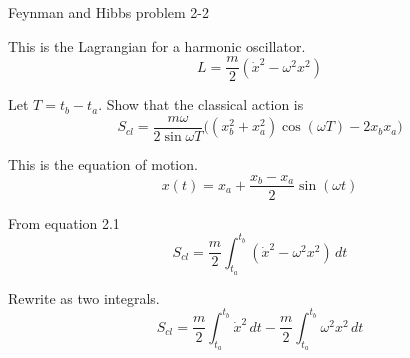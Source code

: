 \documentclass[12pt]{article}
\begin{document}
\noindent
Feynman and Hibbs problem 2-2

\bigskip
\noindent
This is the Lagrangian for a harmonic oscillator.
\begin{equation*}
L=\frac{m}{2}(\dot{x}^2-\omega^2 x^2)
\end{equation*}

\noindent
Let $T=t_b-t_a$.
Show that the classical action is
\begin{equation*}
S_{cl}=\frac{m\omega}{2\sin\omega T}
\bigg((x_b^2+x_a^2)\cos(\omega T)-2x_b x_a\bigg)
\end{equation*}

\noindent
This is the equation of motion.
\begin{equation*}
x(t)=x_a+\frac{x_b-x_a}{2}\sin(\omega t)
\end{equation*}

\noindent
From equation 2.1
\begin{equation*}
S_{cl}=\frac{m}{2}\int_{t_a}^{t_b} (\dot{x}^2-\omega^2 x^2)\,dt
\end{equation*}

\noindent
Rewrite as two integrals.
\begin{equation*}
S_{cl}=\frac{m}{2}\int_{t_a}^{t_b} \dot{x}^2\,dt
-\frac{m}{2}\int_{t_a}^{t_b}\omega^2 x^2\,dt
\end{equation*}
\end{document}
